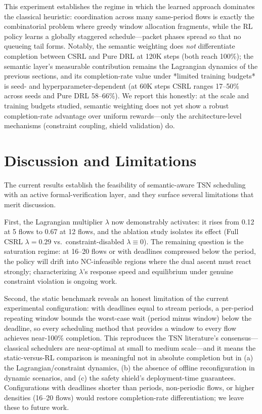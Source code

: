 \documentclass[conference]{IEEEtran}
\begin{document}
This experiment establishes the regime in which the learned approach dominates the classical heuristic: coordination across many same-period flows is exactly the combinatorial problem where greedy window allocation fragments, while the RL policy learns a globally staggered schedule---packet phases spread so that no queueing tail forms. Notably, the semantic weighting does \emph{not} differentiate completion between CSRL and Pure DRL at 120K steps (both reach 100\%); the semantic layer's measurable contribution remains the Lagrangian dynamics of the previous sections, and its completion-rate value under *limited training budgets* is seed- and hyperparameter-dependent (at 60K steps CSRL ranges 17--50\% across seeds and Pure DRL 58--66\%). We report this honestly: at the scale and training budgets studied, semantic weighting does not yet show a robust completion-rate advantage over uniform rewards---only the architecture-level mechanisms (constraint coupling, shield validation) do.

\section{Discussion and Limitations}

The current results establish the feasibility of semantic-aware TSN scheduling with an active formal-verification layer, and they surface several limitations that merit discussion.

First, the Lagrangian multiplier $\lambda$ now demonstrably activates: it rises from 0.12 at 5 flows to 0.67 at 12 flows, and the ablation study isolates its effect (Full CSRL $\lambda=0.29$ vs.\ constraint-disabled $\lambda\equiv0$). The remaining question is the saturation regime: at 16--20 flows or with deadlines compressed below the period, the policy will drift into NC-infeasible regions where the dual ascent must react strongly; characterizing $\lambda$'s response speed and equilibrium under genuine constraint violation is ongoing work.

Second, the static benchmark reveals an honest limitation of the current experimental configuration: with deadlines equal to stream periods, a per-period repeating window bounds the worst-case wait (period minus window) below the deadline, so every scheduling method that provides a window to every flow achieves near-100\% completion. This reproduces the TSN literature's consensus---classical schedulers are near-optimal at small to medium scale---and it means the static-versus-RL comparison is meaningful not in absolute completion but in (a) the Lagrangian/constraint dynamics, (b) the absence of offline reconfiguration in dynamic scenarios, and (c) the safety shield's deployment-time guarantees. Configurations with deadlines shorter than periods, non-periodic flows, or higher densities (16--20 flows) would restore completion-rate differentiation; we leave these to future work.
\end{document}
